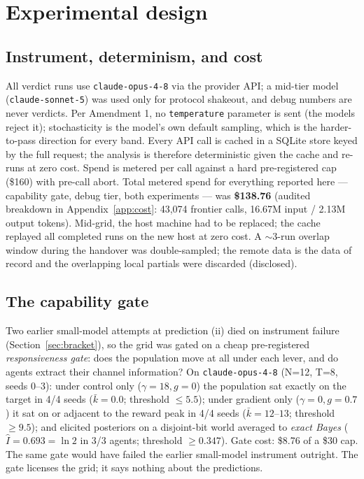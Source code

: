 \documentclass{article} %
\newcommand{\Ihat}{\hat{I}}
\begin{document}
\section{Experimental design}
\label{sec:design}

\subsection{Instrument, determinism, and cost}
\label{sec:instrument}

All verdict runs use \texttt{claude-opus-4-8} via the provider API; a mid-tier model (\texttt{claude-sonnet-5}) was used only for protocol shakeout, and debug numbers are never verdicts. Per Amendment 1, no \texttt{temperature} parameter is sent (the models reject it); stochasticity is the model's own default sampling, which is the harder-to-pass direction for every band. Every API call is cached in a SQLite store keyed by the full request; the analysis is therefore deterministic given the cache and re-runs at zero cost. Spend is metered per call against a hard pre-registered cap (\$160) with pre-call abort. Total metered spend for everything reported here --- capability gate, debug tier, both experiments --- was \textbf{\$138.76} (audited breakdown in Appendix~\ref{app:cost}: 43{,}074 frontier calls, 16.67M input / 2.13M output tokens). Mid-grid, the host machine had to be replaced; the cache replayed all completed runs on the new host at zero cost. A $\sim$3-run overlap window during the handover was double-sampled; the remote data is the data of record and the overlapping local partials were discarded (disclosed).

\subsection{The capability gate}
\label{sec:gate}

Two earlier small-model attempts at prediction (ii) died on instrument failure (Section~\ref{sec:bracket}), so the grid was gated on a cheap pre-registered \emph{responsiveness gate}: does the population move at all under each lever, and do agents extract their channel information? On \texttt{claude-opus-4-8} (N=12, T=8, seeds 0--3): under control only ($\gamma = 18, g = 0$) the population sat exactly on the target in 4/4 seeds ($\bar k = 0.0$; threshold $\leq 5.5$); under gradient only ($\gamma = 0, g = 0.7$) it sat on or adjacent to the reward peak in 4/4 seeds ($\bar k = 12$--$13$; threshold $\geq 9.5$); and elicited posteriors on a disjoint-bit world averaged to \emph{exact Bayes} ($\Ihat = 0.693 = \ln 2$ in 3/3 agents; threshold $\geq 0.347$). Gate cost: \$8.76 of a \$30 cap. The same gate would have failed the earlier small-model instrument outright. The gate licenses the grid; it says nothing about the predictions.
\end{document}
